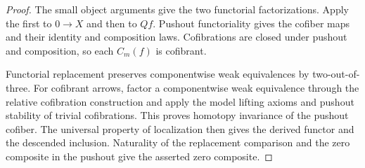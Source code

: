 \begin{proof}
The small object arguments give the two functorial factorizations.
Apply the first to $0\to X$ and then to $Qf$. Pushout functoriality
gives the cofiber maps and their identity and composition laws.
Cofibrations are closed under pushout and composition, so each
$C_m(f)$ is cofibrant.

Functorial replacement preserves componentwise weak equivalences by
two-out-of-three. For cofibrant arrows, factor a componentwise weak
equivalence through the relative cofibration construction and apply
the model lifting axioms and pushout stability of trivial cofibrations.
This proves homotopy invariance of the pushout cofiber. The universal
property of localization then gives the derived functor and the
descended inclusion. Naturality of the replacement comparison and
the zero composite in the pushout give the asserted zero composite.
\end{proof}


